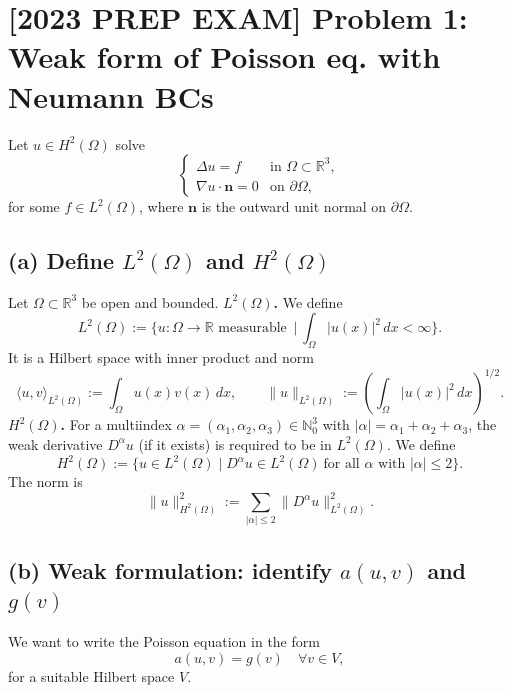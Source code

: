 \section*{[2023 PREP EXAM] Problem 1: Weak form of Poisson eq. with Neumann BCs}

Let $u \in H^2(\Omega)$ solve
\[
    \begin{cases}
        \Delta u = f                  & \text{in } \Omega \subset \mathbb{R}^3, \\
        \nabla u \cdot \mathbf{n} = 0 & \text{on } \partial\Omega,
    \end{cases}
\]
for some $f \in L^2(\Omega)$, where $\mathbf{n}$ is the outward unit normal on $\partial\Omega$.
\subsection*{(a) Define $L^2(\Omega)$ and $H^2(\Omega)$}
Let $\Omega \subset \mathbb{R}^3$ be open and bounded.
\textbf{$L^2(\Omega)$.}
We define
\[
    L^2(\Omega)
    := \bigg\{ u : \Omega \to \mathbb{R} \text{ measurable } \,\bigg|\, \int_\Omega |u(x)|^2\,dx < \infty \bigg\}.
\]
It is a Hilbert space with inner product and norm
\[
    \langle u,v\rangle_{L^2(\Omega)} := \int_\Omega u(x)v(x)\,dx,
    \qquad
    \|u\|_{L^2(\Omega)} := \left(\int_\Omega |u(x)|^2\,dx\right)^{1/2}.
\]
\textbf{$H^2(\Omega)$.}
For a multiindex $\alpha = (\alpha_1,\alpha_2,\alpha_3)\in \mathbb{N}_0^3$ with $|\alpha| = \alpha_1+\alpha_2+\alpha_3$, the weak derivative $D^\alpha u$ (if it exists) is required to be in $L^2(\Omega)$.
We define
\[
    H^2(\Omega)
    := \Big\{ u \in L^2(\Omega) \;\Big|\; D^\alpha u \in L^2(\Omega)\ \text{for all } \alpha \text{ with }|\alpha|\le 2\Big\}.
\]
The norm is
\[
    \|u\|_{H^2(\Omega)}^2
    := \sum_{|\alpha|\le 2} \|D^\alpha u\|_{L^2(\Omega)}^2.
\]
\subsection*{(b) Weak formulation: identify $a(u,v)$ and $g(v)$}
We want to write the Poisson equation in the form
\[
    a(u,v) = g(v) \quad \forall v \in V,
\]
for a suitable Hilbert space $V$.

